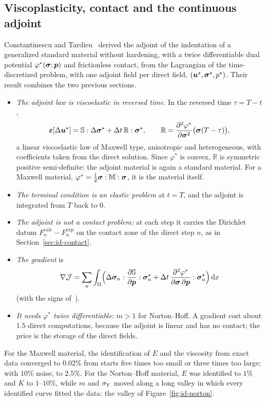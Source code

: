 \subsection{Viscoplasticity, contact and the continuous adjoint}\label{ssec:id-vp-adj}
%
Constantinescu and Tardieu~\cite{ConstantinescuTardieu2001b} derived the adjoint
of the indentation of a generalized standard material without hardening, with a
twice differentiable dual potential $\varphi^\ast(\bm{\sigma};\bm{p})$ and frictionless
contact, from the Lagrangian of the time-discretized problem, with one adjoint
field per direct field, $(\bm{u}^\star,\bm{\sigma}^\star,p^\star)$. Their result combines the
two previous sections.
\begin{itemize}
  \item \emph{The adjoint law is viscoelastic in reversed time.} In the reversed
  time $\tau=T-t$,
  \[
    \bm{\varepsilon}[\Delta\bm{u}^\star]=\mathbb{S}:\Delta\bm{\sigma}^\star+\Delta t\,\mathbb{R}:\bm{\sigma}^\star,
    \qquad \mathbb{R}=\frac{\partial^2\varphi^\ast}{\partial\bm{\sigma}^2}\bigl(\bm{\sigma}(T-\tau)\bigr),
  \]
  a linear viscoelastic law of Maxwell type, anisotropic and heterogeneous, with
  coefficients taken from the direct solution. Since $\varphi^\ast$ is convex,
  $\mathbb R$ is symmetric positive semi-definite: the adjoint material is again
  a standard material. For a Maxwell material, $\varphi^\ast=\tfrac12\bm{\sigma}:\mathbb M:\bm{\sigma}$,
  it is the material itself.
  \item \emph{The terminal condition is an elastic problem} at $t=T$, and the
  adjoint is integrated from $T$ back to $0$.
  \item \emph{The adjoint is not a contact problem:} at each step it carries the
  Dirichlet datum $F^{\mathrm{calc}}_n-F^{\mathrm{exp}}_n$ on the contact zone of
  the direct step $n$, as in Section~\ref{sec:id-contact}.
  \item \emph{The gradient} is
  \[
    \nabla\mathcal J=\sum_n\int_\Omega\Bigl(\Delta\bm{\sigma}_n:\frac{\partial\mathbb{S}}{\partial\bm{p}}:\bm{\sigma}^\star_n
    +\Delta t\,\frac{\partial^2\varphi^\ast}{\partial\bm{\sigma}\,\partial\bm{p}}:\bm{\sigma}^\star_n\Bigr)\,\mathrm{d} x
  \]
  (with the signs of~\cite{ConstantinescuTardieu2001b}).
  \item \emph{It needs $\varphi^\ast$ twice differentiable}: $m>1$ for Norton--Hoff.
  A gradient cost about $1.5$ direct computations, because the adjoint is linear
  and has no contact; the price is the storage of the direct fields.
\end{itemize}
For the Maxwell material, the identification of $E$ and the viscosity from
exact data converged to $0.02\%$ from starts five times too small or three times
too large; with $10\%$ noise, to $2.5\%$. For the Norton--Hoff material, $E$ was
identified to $1\%$ and $K$ to $1$--$10\%$, while $m$ and $\sigma_{Y}$ moved along a long
valley in which every identified curve fitted the data: the valley of
Figure~\ref{fig:id-norton}.

